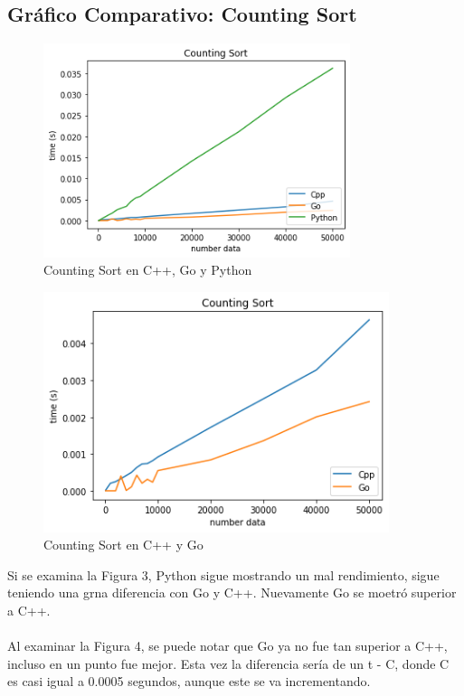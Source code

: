 \documentclass[https://www.overleaf.com/project/63761df255a8a9f4a15c3579
	letterpaper, %
	10pt, %
]{CSUniSchoolLabReport}
\begin{document}
\subsection{ Gráfico Comparativo: Counting Sort}

\begin{figure}[H] 
	\centering 
	\includegraphics[width=0.8\textwidth]{Figures/countingSort.png} %
	\caption{Counting Sort en C++, Go y Python}
\end{figure}

\begin{figure}[H] 
	\centering 
	\includegraphics[width=0.9\textwidth]{Figures/countingSort2.png} %
	\caption{Counting Sort en C++ y Go}
\end{figure}

Si se examina la Figura 3, Python sigue mostrando un mal rendimiento, sigue teniendo una grna diferencia con Go y C++. Nuevamente Go se moetró superior a C++. \\\\
Al examinar la Figura 4, se puede notar que Go ya no fue tan superior a C++, incluso en un punto fue mejor. Esta vez la diferencia sería de un t - C, donde C es casi igual a 0.0005 segundos, aunque este se va incrementando.
\end{document}
